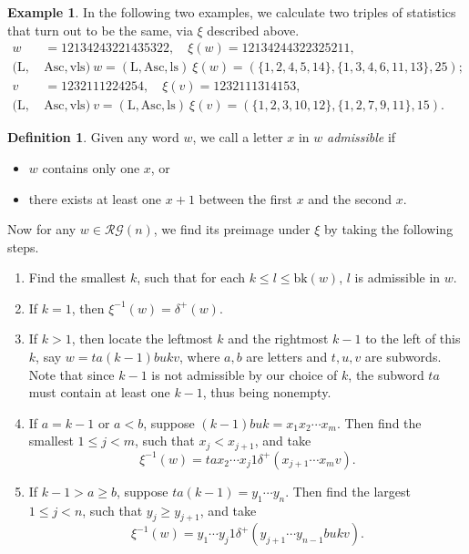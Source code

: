 \documentclass[12pt]{amsart}
\numberwithin{equation}{section}
\theoremstyle{plain}
\theoremstyle{definition}
\newtheorem{Def}[theorem]{Definition}
\newtheorem{example}[theorem]{Example}
\def\bk{\mathrm{bk}}
\def\ls{\mathrm{ls}}
\def\wls{\mathrm{vls}}
\def\Asc{\mathrm{Asc}}
\def\LL{\mathrm{L}}
\def\RG{\mathcal{RG}}
\begin{document}
\begin{example}
In the following two examples, we calculate two triples of statistics that turn out to be the same, via $\xi$ described above.
\begin{align*}
w &= 12134243221435322, \quad \xi(w) = 12134244322325211,\\
(\LL,\:& \Asc, \wls)\:w =(\LL, \Asc, \ls)\:\xi(w)=(\{1,2,4,5,14\},\{1,3,4,6,11,13\},25);\\
v &= 1232111224254, \quad \xi(v) = 1232111314153,\\
(\LL,\:& \Asc, \wls)\:v =(\LL, \Asc, \ls)\:\xi(v)=(\{1,2,3,10,12\},\{1,2,7,9,11\},15).
\end{align*}
\end{example}
\begin{Def}
Given any word $w$, we call a letter $x$ in $w$ \emph{admissible} if
\begin{itemize}
	\item $w$ contains only one $x$, or
	\item there exists at least one $x+1$ between the first $x$ and the second $x$.
\end{itemize}
\end{Def}
Now for any $w\in\RG(n)$, we find its preimage under $\xi$ by taking the following steps.
\begin{enumerate}
	\item Find the smallest $k$, such that for each $k\le l\le \bk(w)$, $l$ is admissible in $w$.
	\item If $k=1$, then $\xi^{-1}(w)=\delta^+(w)$.
	\item If $k>1$, then locate the leftmost $k$ and the rightmost $k-1$ to the left of this $k$, say $w=ta(k-1)bukv$, where $a,b$ are letters and $t,u,v$ are subwords. Note that since $k-1$ is not admissible by our choice of $k$, the subword $ta$ must contain at least one $k-1$, thus being nonempty.
	\item If $a=k-1$ or $a<b$, suppose $(k-1)buk=x_1x_2\cdots x_m$. Then find the smallest $1\le j < m$, such that $x_j<x_{j+1}$, and take $$\xi^{-1}(w)=tax_2\cdots x_j 1\delta^+(x_{j+1}\cdots x_m v).$$
	\item If $k-1 > a\ge b$, suppose $ta(k-1)=y_1\cdots y_n$. Then find the largest $1\le j<n$, such that $y_j\ge y_{j+1}$, and take $$\xi^{-1}(w)=y_1\cdots y_j 1 \delta^+(y_{j+1}\cdots y_{n-1}bukv).$$
\end{enumerate}
\end{document}
